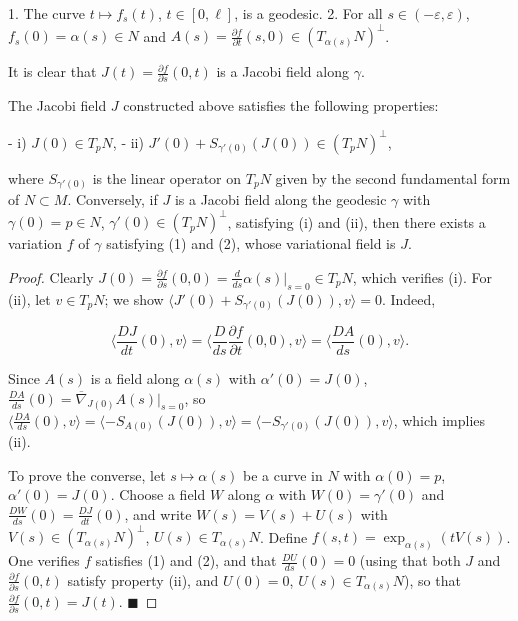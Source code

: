 1. The curve $t\mapsto f_s(t)$, $t\in[0,\ell]$, is a geodesic.
2. For all $s\in(-\varepsilon,\varepsilon)$, $f_s(0)=\alpha(s)\in N$ and
$A(s)=\frac{\partial f}{\partial t}(s,0)\in(T_{\alpha(s)}N)^\perp$.

It is clear that $J(t)=\frac{\partial f}{\partial s}(0,t)$ is a Jacobi field along
$\gamma$.

\begin{lemma}[Lemma 4.1]
  \label{lem:dc-ch10-4-1}
  The Jacobi field $J$ constructed above satisfies the following properties:
  
  - i) $J(0)\in T_pN$,
  - ii) $J'(0)+S_{\gamma'(0)}(J(0))\in(T_pN)^\perp$,
  
  where $S_{\gamma'(0)}$ is the linear operator on $T_pN$ given by the second
  fundamental form of $N\subset M$. Conversely, if $J$ is a Jacobi field along the
  geodesic $\gamma$ with $\gamma(0)=p\in N$, $\gamma'(0)\in(T_pN)^\perp$, satisfying
  (i) and (ii), then there exists a variation $f$ of $\gamma$ satisfying (1) and (2),
  whose variational field is $J$.
\end{lemma}
\begin{proof}
  Clearly $J(0)=\frac{\partial f}{\partial s}(0,0)=\frac{d}{ds}\alpha(s)|_{s=0}\in T_pN$,
  which verifies (i). For (ii), let $v\in T_pN$; we show
  $\langle J'(0)+S_{\gamma'(0)}(J(0)),v\rangle=0$. Indeed,
  
  $$
  \Big\langle\frac{DJ}{dt}(0),v\Big\rangle=\Big\langle\frac{D}{ds}\frac{\partial f}{\partial t}(0,0),v\Big\rangle=\Big\langle\frac{DA}{ds}(0),v\Big\rangle.
  $$
  
  Since $A(s)$ is a field along $\alpha(s)$ with $\alpha'(0)=J(0)$,
  $\frac{DA}{ds}(0)=\overline\nabla_{J(0)}A(s)|_{s=0}$, so
  $\langle\frac{DA}{ds}(0),v\rangle=\langle-S_{A(0)}(J(0)),v\rangle=\langle-S_{\gamma'(0)}(J(0)),v\rangle$,
  which implies (ii).
  
  To prove the converse, let $s\mapsto\alpha(s)$ be a curve in $N$ with
  $\alpha(0)=p$, $\alpha'(0)=J(0)$. Choose a field $W$ along $\alpha$ with
  $W(0)=\gamma'(0)$ and $\frac{DW}{ds}(0)=\frac{DJ}{dt}(0)$, and write
  $W(s)=V(s)+U(s)$ with $V(s)\in(T_{\alpha(s)}N)^\perp$, $U(s)\in T_{\alpha(s)}N$.
  Define $f(s,t)=\exp_{\alpha(s)}(tV(s))$. One verifies $f$ satisfies (1) and (2),
  and that $\frac{DU}{ds}(0)=0$ (using that both $J$ and $\frac{\partial f}{\partial s}(0,t)$
  satisfy property (ii), and $U(0)=0$, $U(s)\in T_{\alpha(s)}N$), so that
  $\frac{\partial f}{\partial s}(0,t)=J(t)$. $\blacksquare$
\end{proof}

